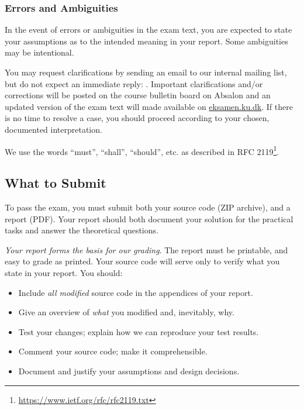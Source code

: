 \subsubsection*{Errors and Ambiguities}

In the event of errors or ambiguities in the exam text, you are expected to
state your assumptions as to the intended meaning in your report.
%
Some ambiguities may be intentional.

You may request clarifications by sending an email to our internal mailing
list, but do not expect an immediate reply: \mailinglist{}. Important
clarifications and/or corrections will be posted on the course bulletin board
on Absalon and an updated version of the exam text will made available on
\url{eksamen.ku.dk}. If there is no time to resolve a case, you should proceed
according to your chosen, documented interpretation.

We use the words ``must'', ``shall'', ``should'', etc. as described in RFC
2119\footnote{\url{https://www.ietf.org/rfc/rfc2119.txt}}.

\subsection*{What to Submit}

To pass the exam, you must submit both your source code (ZIP archive), and a
report (PDF).  Your report should both document your solution for the practical
tasks and answer the theoretical questions.

\emph{Your report forms the basis for our grading}. The report must be
printable, and easy to grade as printed. Your source code will serve only to
verify what you state in your report. You should:

\begin{itemize}

\item  Include \emph{all modified} source code in the appendices of your
report.

\item Give an overview of \emph{what} you modified and, inevitably, why.

\item Test your changes; explain how we can reproduce your test results.

\item Comment your source code; make it comprehensible.

\item Document and justify your assumptions and design decisions.

\end{itemize}

